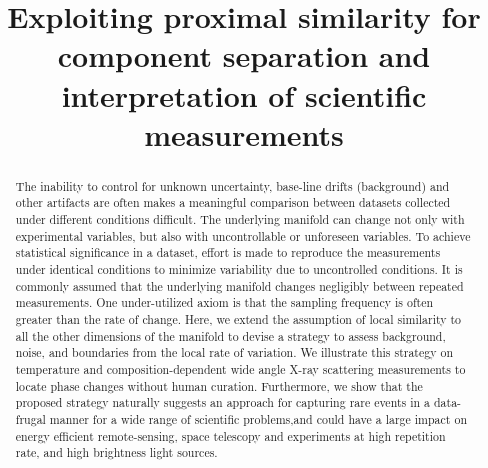 \documentclass[12pt]{iopart}
\begin{document}
\title[]{Exploiting proximal similarity for component separation and interpretation of scientific measurements}

\author{}


\begin{abstract}
The inability to control for unknown uncertainty, base-line drifts (background) and other artifacts are often makes a meaningful comparison between datasets collected under different conditions difficult.  The underlying manifold can change not only with experimental variables, but also with uncontrollable or unforeseen variables.  To achieve statistical significance in a dataset, effort is made to reproduce the measurements under identical conditions to minimize variability due to uncontrolled conditions.  It is commonly assumed that the underlying manifold changes negligibly between repeated measurements.  One under-utilized axiom is that the sampling frequency is often greater than the rate of change.  Here, we extend the assumption of local similarity to all the other dimensions of the manifold to devise a strategy to assess background, noise, and boundaries from the local rate of variation.  We illustrate this strategy on temperature and composition-dependent wide angle X-ray scattering measurements to locate phase changes without human curation.  Furthermore, we show that the proposed strategy naturally suggests an approach for capturing rare events in a data-frugal manner for a wide range of scientific problems,and could have a large impact on energy efficient remote-sensing, space telescopy and experiments at high repetition rate, and high brightness light sources.
\end{abstract}

%
%
%
% 
%
\end{document}
